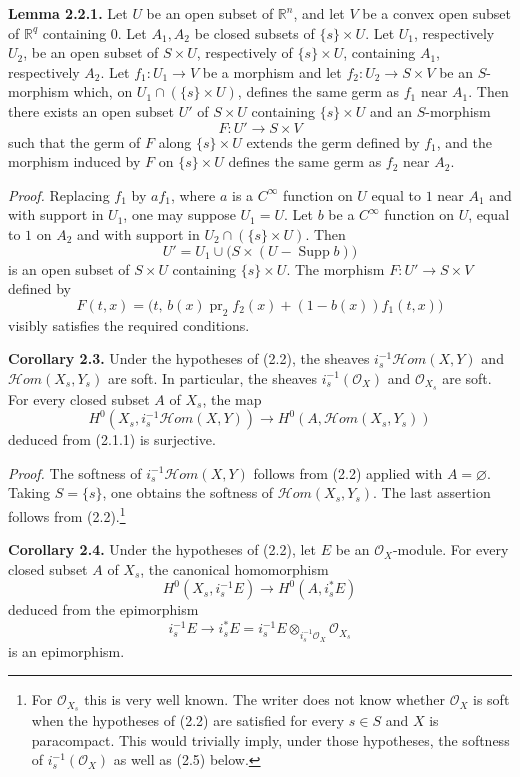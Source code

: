 \documentclass[11pt]{article}
\begin{document}
\textbf{Lemma 2.2.1.} Let $U$ be an open subset of $\mathbb R^n$, and let $V$ be a convex open subset of $\mathbb R^q$ containing $0$. Let $A_1,A_2$ be closed subsets of $\{s\}\times U$. Let $U_1$, respectively $U_2$, be an open subset of $S\times U$, respectively of $\{s\}\times U$, containing $A_1$, respectively $A_2$. Let $f_1:U_1\to V$ be a morphism and let $f_2:U_2\to S\times V$ be an $S$-morphism which, on $U_1\cap(\{s\}\times U)$, defines the same germ as $f_1$ near $A_1$. Then there exists an open subset $U'$ of $S\times U$ containing $\{s\}\times U$ and an $S$-morphism
\[
 F:U'\longrightarrow S\times V
\]
such that the germ of $F$ along $\{s\}\times U$ extends the germ defined by $f_1$, and the morphism induced by $F$ on $\{s\}\times U$ defines the same germ as $f_2$ near $A_2$.

\emph{Proof.} Replacing $f_1$ by $af_1$, where $a$ is a $C^\infty$ function on $U$ equal to $1$ near $A_1$ and with support in $U_1$, one may suppose $U_1=U$. Let $b$ be a $C^\infty$ function on $U$, equal to $1$ on $A_2$ and with support in $U_2\cap(\{s\}\times U)$. Then
\[
 U' = U_1\cup\bigl(S\times (U-\operatorname{Supp}b)\bigr)
\]
is an open subset of $S\times U$ containing $\{s\}\times U$. The morphism $F:U'\to S\times V$ defined by
\[
 F(t,x)=\bigl(t,\,b(x)\operatorname{pr}_2 f_2(x)+(1-b(x))f_1(t,x)\bigr)
\]
visibly satisfies the required conditions.

\textbf{Corollary 2.3.} Under the hypotheses of (2.2), the sheaves $i_s^{-1}\mathcal Hom(X,Y)$ and $\mathcal Hom(X_s,Y_s)$ are soft. In particular, the sheaves $i_s^{-1}(\mathcal O_X)$ and $\mathcal O_{X_s}$ are soft. For every closed subset $A$ of $X_s$, the map
\[
 H^0(X_s,i_s^{-1}\mathcal Hom(X,Y))\longrightarrow H^0(A,\mathcal Hom(X_s,Y_s))
\]
deduced from (2.1.1) is surjective.

\emph{Proof.} The softness of $i_s^{-1}\mathcal Hom(X,Y)$ follows from (2.2) applied with $A=\varnothing$. Taking $S=\{s\}$, one obtains the softness of $\mathcal Hom(X_s,Y_s)$. The last assertion follows from (2.2).\footnote{For $\mathcal O_{X_s}$ this is very well known. The writer does not know whether $\mathcal O_X$ is soft when the hypotheses of (2.2) are satisfied for every $s\in S$ and $X$ is paracompact. This would trivially imply, under those hypotheses, the softness of $i_s^{-1}(\mathcal O_X)$ as well as (2.5) below.}

\textbf{Corollary 2.4.} Under the hypotheses of (2.2), let $E$ be an $\mathcal O_X$-module. For every closed subset $A$ of $X_s$, the canonical homomorphism
\[
 H^0(X_s,i_s^{-1}E)\longrightarrow H^0(A,i_s^*E)
\]
deduced from the epimorphism
\[
 i_s^{-1}E\longrightarrow i_s^*E=i_s^{-1}E\otimes_{i_s^{-1}\mathcal O_X}\mathcal O_{X_s}
\]
is an epimorphism.
\end{document}
